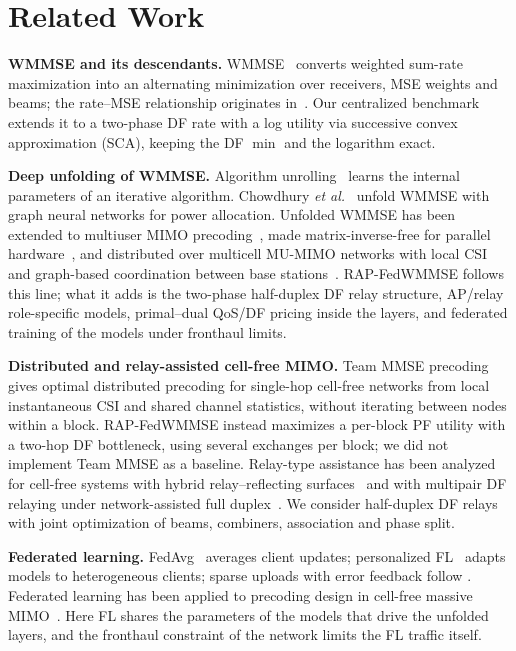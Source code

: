 \documentclass[conference]{IEEEtran}
\begin{document}
\section{Related Work}
\textbf{WMMSE and its descendants.} WMMSE~\cite{shi2011wmmse} converts
weighted sum-rate maximization into an alternating minimization over
receivers, MSE weights and beams; the rate--MSE relationship originates
in~\cite{christensen2008wmmse}. Our centralized benchmark extends it to a
two-phase DF rate with a log utility via successive convex approximation
(SCA), keeping the DF $\min$ and the logarithm exact.

\textbf{Deep unfolding of WMMSE.} Algorithm unrolling~\cite{monga2021unrolling}
learns the internal parameters of an iterative algorithm. Chowdhury
\emph{et al.}~\cite{chowdhury2021unfolding} unfold WMMSE with graph neural
networks for power allocation. Unfolded WMMSE has been extended to multiuser MIMO
precoding~\cite{hu2021iaidnn}, made matrix-inverse-free for parallel
hardware~\cite{pellaco2022inversefree}, and distributed over multicell
MU-MIMO networks with local CSI and graph-based coordination between base
stations~\cite{schynol2023gcnwmmse}. RAP-FedWMMSE follows this line; what it
adds is the two-phase half-duplex DF relay structure, AP/relay role-specific
models, primal--dual QoS/DF pricing inside the layers, and federated training
of the models under fronthaul limits.

\textbf{Distributed and relay-assisted cell-free MIMO.} Team MMSE
precoding~\cite{miretti2022team} gives optimal distributed precoding for
single-hop cell-free networks from local instantaneous CSI and shared channel
statistics, without iterating between nodes within a block. RAP-FedWMMSE
instead maximizes a per-block PF utility with a two-hop DF bottleneck, using
several exchanges per block; we did not implement Team MMSE as a baseline. Relay-type assistance has been analyzed for
cell-free systems with hybrid relay--reflecting surfaces~\cite{nguyen2023hrris}
and with multipair DF relaying under network-assisted full
duplex~\cite{vu2023dfrelay}. We consider half-duplex DF relays with joint
optimization of beams, combiners, association and phase split.

\textbf{Federated learning.} FedAvg~\cite{mcmahan2017fedavg} averages client
updates; personalized FL~\cite{tan2022personalized} adapts models to
heterogeneous clients; sparse uploads with error feedback follow
\cite{aji2017sparse}. Federated learning has been applied to precoding design
in cell-free massive MIMO~\cite{wang2023flprecoding}. Here FL shares the
parameters of the models that drive the unfolded layers, and the fronthaul
constraint of the network limits the FL traffic itself.
\end{document}
